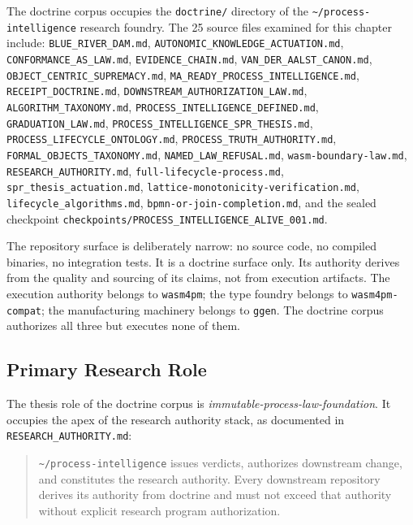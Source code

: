 The doctrine corpus occupies the \texttt{doctrine/} directory of the
\texttt{\textasciitilde/process-intelligence} research foundry. The 25 source files examined
for this chapter include: \texttt{BLUE\_RIVER\_DAM.md},
\texttt{AUTONOMIC\_KNOWLEDGE\_ACTUATION.md}, \texttt{CONFORMANCE\_AS\_LAW.md},
\texttt{EVIDENCE\_CHAIN.md}, \texttt{VAN\_DER\_AALST\_CANON.md},
\texttt{OBJECT\_CENTRIC\_SUPREMACY.md}, \texttt{MA\_READY\_PROCESS\_INTELLIGENCE.md},
\texttt{RECEIPT\_DOCTRINE.md}, \texttt{DOWNSTREAM\_AUTHORIZATION\_LAW.md},
\texttt{ALGORITHM\_TAXONOMY.md}, \texttt{PROCESS\_INTELLIGENCE\_DEFINED.md},
\texttt{GRADUATION\_LAW.md}, \texttt{PROCESS\_INTELLIGENCE\_SPR\_THESIS.md},
\texttt{PROCESS\_LIFECYCLE\_ONTOLOGY.md}, \texttt{PROCESS\_TRUTH\_AUTHORITY.md},
\texttt{FORMAL\_OBJECTS\_TAXONOMY.md}, \texttt{NAMED\_LAW\_REFUSAL.md},
\texttt{wasm-boundary-law.md}, \texttt{RESEARCH\_AUTHORITY.md},
\texttt{full-lifecycle-process.md}, \texttt{spr\_thesis\_actuation.md},
\texttt{lattice-monotonicity-verification.md}, \texttt{lifecycle\_algorithms.md},
\texttt{bpmn-or-join-completion.md}, and the sealed checkpoint
\texttt{checkpoints/PROCESS\_INTELLIGENCE\_ALIVE\_001.md}.

The repository surface is deliberately narrow: no source code, no compiled binaries, no
integration tests. It is a doctrine surface only. Its authority derives from the quality and
sourcing of its claims, not from execution artifacts. The execution authority belongs to
\texttt{wasm4pm}; the type foundry belongs to \texttt{wasm4pm-compat}; the manufacturing
machinery belongs to \texttt{ggen}. The doctrine corpus authorizes all three but executes
none of them.

\subsection{Primary Research Role}
\label{sec:doctrine-identity-role}

The thesis role of the doctrine corpus is \emph{immutable-process-law-foundation}. It
occupies the apex of the research authority stack, as documented in
\texttt{RESEARCH\_AUTHORITY.md}:

\begin{quote}
\texttt{\textasciitilde/process-intelligence} issues verdicts, authorizes downstream change,
and constitutes the research authority. Every downstream repository derives its authority
from doctrine and must not exceed that authority without explicit research program
authorization.
\end{quote}

